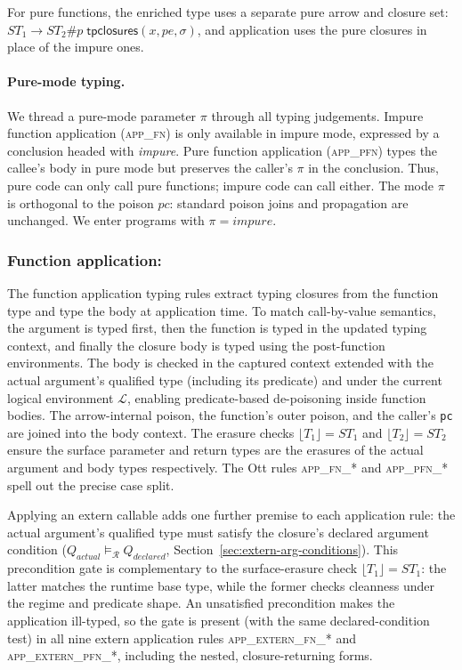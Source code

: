 \documentclass[12pt]{article}
\begin{document}
\noindent For pure functions, the enriched type uses a separate pure arrow and
closure set: $ST_1 \rightarrow ST_2 \# p\; \mathsf{tpclosures}(x,pe,\sigma)$,
and application uses the pure closures in place of the impure ones.

\paragraph{Pure-mode typing.} We thread a pure-mode parameter \(\pi\) through
all typing judgements. Impure function application (\textsc{app\_fn}) is only
available in impure mode, expressed by a conclusion headed with \textit{impure}.
Pure function application (\textsc{app\_pfn}) types the callee's body in pure
mode but preserves the caller's \(\pi\) in the conclusion. Thus, pure code can
only call pure functions; impure code can call either. The mode \(\pi\) is
orthogonal to the poison \(pc\): standard poison joins and propagation are
unchanged. We enter programs with \(\pi = \textit{impure}\).

\subsubsection*{Function application:}
The function application typing rules extract typing closures from the function
type and type the body at application time. To match call-by-value semantics,
the argument is typed first, then the function is typed in the updated typing
context, and finally the closure body is typed using the post-function
environments. The body is checked in the captured
context extended with the actual argument's qualified type (including its
predicate) and under the current logical environment $\mathcal{L}$, enabling
predicate-based de-poisoning inside function bodies. The arrow-internal poison,
the function's outer poison, and the caller's \texttt{pc} are joined into the
body context. The erasure checks $\lfloor T_1 \rfloor = ST_1$ and $\lfloor T_2 \rfloor = ST_2$ ensure
the surface parameter and return types are the erasures of the actual argument
and body types respectively. The Ott rules \textsc{app\_fn\_*} and
\textsc{app\_pfn\_*} spell out the precise case split.

Applying an extern callable adds one further premise to each application rule:
the actual argument's qualified type must satisfy the closure's declared argument
condition (\(Q_{\mathit{actual}} \vDash_{\mathcal{R}} Q_{\mathit{declared}}\),
Section~\ref{sec:extern-arg-conditions}). This precondition gate is complementary
to the surface-erasure check $\lfloor T_1 \rfloor = ST_1$: the latter matches the runtime
base type, while the former checks cleanness under the regime and predicate shape.
An unsatisfied precondition makes the application ill-typed, so the gate is
present (with the same declared-condition test) in all nine extern application
rules \textsc{app\_extern\_fn\_*} and \textsc{app\_extern\_pfn\_*}, including the
nested, closure-returning forms.
\end{document}
